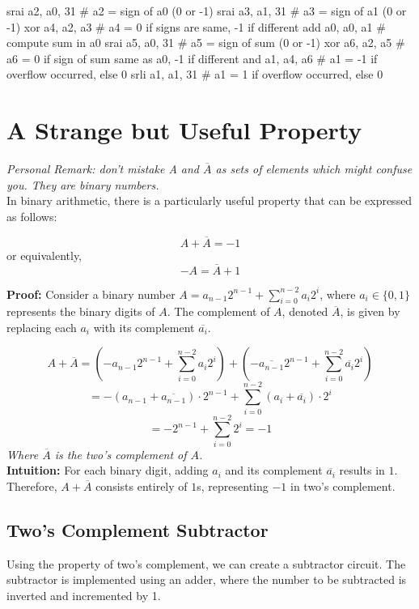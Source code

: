 \begin{assembly}
srai a2, a0, 31       # a2 = sign of a0 (0 or -1)
srai a3, a1, 31       # a3 = sign of a1 (0 or -1)
xor  a4, a2, a3       # a4 = 0 if signs are same, -1 if different
add  a0, a0, a1       # compute sum in a0
srai a5, a0, 31       # a5 = sign of sum (0 or -1)
xor  a6, a2, a5       # a6 = 0 if sign of sum same as a0, -1 if different
and  a1, a4, a6       # a1 = -1 if overflow occurred, else 0
srli a1, a1, 31       # a1 = 1 if overflow occurred, else 0
\end{assembly}

\section{A Strange but Useful Property}
\textit{Personal Remark: don't mistake A and $\overline{A}$ as sets of elements which might confuse you. They are binary numbers.} \\
In binary arithmetic, there is a particularly useful property that can be expressed as follows:

\[
A + \overline{A} = -1
\]
or equivalently,
\[
-A = \overline{A} + 1
\]

\textbf{Proof:} Consider a binary number $A = a_{n-1}2^{n-1} + \sum_{i=0}^{n-2} a_i 2^i$, where $a_i \in \{0,1\}$ represents the binary digits of $A$. The complement of $A$, denoted $\overline{A}$, is given by replacing each $a_i$ with its complement $\overline{a_i}$.

\[
A + \overline{A} = \left( -a_{n-1}2^{n-1} + \sum_{i=0}^{n-2} a_i 2^i \right) + \left( -\overline{a_{n-1}} 2^{n-1} + \sum_{i=0}^{n-2} \overline{a_i} 2^i \right)
\]
\[
= -(a_{n-1} + \overline{a_{n-1}}) \cdot 2^{n-1} + \sum_{i=0}^{n-2} (a_i + \overline{a_i}) \cdot 2^i
\]
\[
= -2^{n-1} + \sum_{i=0}^{n-2} 2^i = -1
\]
\textit{Where $\overline{A}$ is the two's complement of $A$.} \\
\textbf{Intuition:} For each binary digit, adding $a_i$ and its complement $\overline{a_i}$ results in $1$. Therefore, $A + \overline{A}$ consists entirely of $1$s, representing $-1$ in two's complement.
\subsection{Two's Complement Subtractor}
Using the property of two's complement, we can create a subtractor circuit. The subtractor is implemented using an adder, where the number to be subtracted is inverted and incremented by 1.

